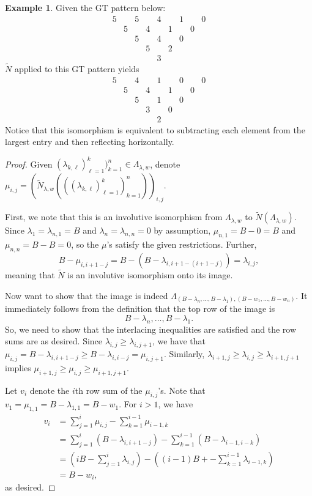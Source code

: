 \documentclass[10pt]{article}
\theoremstyle{plain}
\theoremstyle{definition}
\newtheorem{example}[thm]{Example}
\begin{document}
\begin{example}
Given the GT pattern below:
\[
\begin{matrix}
5 & & 5 & & 4 & & 1 & & 0\\
&5 & & 4 & & 1 & & 0\\
&&5 & & 4 & & 0\\
&&&5 & & 2\\
&&&&3
\end{matrix}\]
$\tilde{N}$ applied to this GT pattern yields 
\[
\begin{matrix}
5 & & 4 & & 1 & & 0 & & 0 \\
&5 & & 4 & & 1 & & 0 \\
&&5 & & 1 & & 0\\
&&&3 & & 0 \\
&&&&2
\end{matrix}
\]
Notice that this isomorphism is equivalent to subtracting each element from the largest entry and then reflecting horizontally.
\end{example}

\begin{proof}
Given $(\lambda_{k,\ell})_{\ell=1}^k)_{k=1}^n \in 
\Lambda_{\lambda, w}$, denote $\mu_{i,j} = \left(\tilde{N}_{\lambda,w}\left( ((\lambda_{k,\ell})_{\ell=1}^k)_{k=1}^n\right)\right)_{i,j}.$

First, we note that this is an involutive isomorphism from $\Lambda_{\lambda,w}$ to $\tilde{N}\left( \Lambda_{\lambda,w}\right)$.  Since $\lambda_1 = \lambda_{n,1}=B$ and $\lambda_n =\lambda_{n,n}=0$ by assumption, $\mu_{n,1}=B-0=B$ and $\mu_{n,n}=B-B=0$, so the $\mu$'s satisfy the given restrictions.  Further, 
\[
B-\mu_{i,i+1-j} = B-\left(B-\lambda_{i,i+1-(i+1-j)}\right) =\lambda_{i,j},
\]
meaning that $\tilde{N}$ is an involutive isomorphism onto its image.

Now want to show that the image is indeed $\Lambda_{(B-\lambda_n, \hdots, B-\lambda_1),(B-w_1, \hdots, B-w_n)}$. It immediately follows from the definition that the top row of the image is
\[
B-\lambda_n, \hdots, B-\lambda_1.
\]
So, we need to show that the interlacing inequalities are satisfied and the row sums are as desired. Since $\lambda_{i,j} \geq \lambda_{i,j+1}$, we have that $\mu_{i,j} =B- \lambda_{i,i+1-j} \geq B - \lambda_{i,i-j}=\mu_{i,j+1}$. Similarly, $\lambda_{i+1,j} \geq \lambda_{i,j}\geq \lambda_{i+1,j+1}$ implies $\mu_{i+1,j} \geq \mu_{i,j}\geq \mu_{i+1,j+1}$. 

Let $v_i$ denote the $i$th row sum of the $\mu_{i,j}$'s.  Note that $v_1 = \mu_{1,1} = B-\lambda_{1,1} = B-w_1$.  For $i>1$, we have
\begin{align*}
v_i &= \sum_{j=1}^i \mu_{i,j} - \sum_{k=1}^{i-1} \mu_{i-1,k}\\
&= \sum_{j=1}^i (B-\lambda_{i,i+1-j}) - \sum_{k=1}^{i-1} (B-\lambda_{i-1,i-k})\\
&= \left(iB -\sum_{j=1}^i \lambda_{i,j}\right) -\left((i-1)B + -\sum_{k=1}^{i-1} \lambda_{i-1,k} \right)\\
&= B - w_i,
\end{align*}
as desired.
\end{proof}
\end{document}
